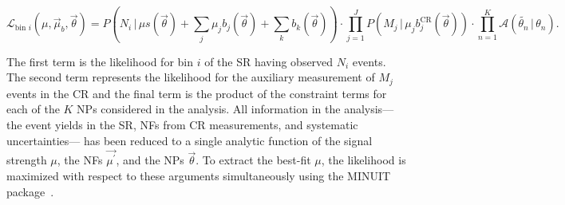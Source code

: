 \begin{equation}
\mathscr{L}_{\textrm{bin }i}(\mu,\vec{\mu}_{b},\vec{\theta}) = P(N_i\,|\,
\mu s(\vec{\theta}) + \sum_j \mu_j b_j(\vec{\theta}) + \sum_k
b_k(\vec{\theta})) \cdot \prod_{j=1}^J P(M_j\,|\, \mu_j
b^{\textrm{CR}}_j(\vec{\theta})) \cdot \prod_{n=1}^K \mathscr{A}(\tilde{\theta_n}\,|\,\theta_n).
\label{chapter:statistics:equation:LH_bin_full}
\end{equation}

\noindent
The first term is the likelihood for bin $i$ of the SR having observed
$N_i$ events. The second term represents the likelihood for the auxiliary
measurement of $M_j$ events in the CR and the final term is the
product of the constraint terms for each of the $K$ NPs considered in
the analysis. All information in the analysis--- the event yields in the SR, NFs from
CR measurements, and systematic uncertainties--- has been reduced to a
single analytic function of the signal strength $\mu$, the NFs
$\vec{\mu^{\prime}}$, and the NPs $\vec{\theta}$. To extract the
best-fit $\mu$, the likelihood is maximized with respect to these
arguments simultaneously using the M{\textsc INUIT}
package~\cite{bib:James:1975dr}. 

